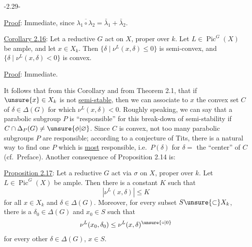 \begin{center}-2.29-\end{center}

\uline{Proof}: Immediate, since $\overline{\lambda_1\circ\lambda_2}=\bar\lambda_1+\bar\lambda_2$.

\uline{Corollary 2.16}: Let a reductive $G$ act on $X$, proper over $k$. Let $L\in\operatorname{Pic}^G(X)$ be ample, and let $x\in X_k$. Then $\{\delta\mid\nu^L(x,\delta)\leq0\}$ is semi-convex, and $\{\delta\mid\nu^L(x,\delta)<0\}$ is convex.

\uline{Proof}: Immediate.

It follows that from this Corollary and from Theorem 2.1, that if $\unsure{x}\in X_k$ is not \uline{semi-stable}, then we can associate to $x$ the convex set $C$ of $\delta\in\Delta(G)$ for which $\nu^L(x,\delta)<0$. Roughly speaking, we can say that a parabolic subgroup $P$ is ``responsible'' for this break-down of semi-stability if $C\cap\Delta_P(G)\neq\unsure{\phi|\varnothing}$. Since $C$ is convex, not too many parabolic subgroups $P$ are responsible; according to a conjecture of Tits, there is  a natural way to find one $P$ which is \uline{most} responsible, i.e.\ $P(\delta)$ for $\delta=$ the ``center'' of $C$ (cf.\ Preface).
Another consequence of Proposition 2.14 is:

\uline{Proposition 2.17}: Let a reductive $G$ act via $\sigma$ on $X$, proper over $k$. Let $L\in\operatorname{Pic}^G(X)$ be ample. Then there is a constant $K$ such that
\[
|\nu^L(x,\delta)|\leq K
\]
for all $x\in X_k$ and $\delta\in\Delta(G)$. Moreover, for every subset $S\unsure{\subset}X_k$, there is a $\delta_0\in\Delta(G)$ and $x_0\in S$ such that
\[
\nu^L(x_0,\delta_0)\leq\nu^L(x,\delta)^{\unsure{\circ|0}}
\]
for every other $\delta\in\Delta(G)$, $x\in S$.
